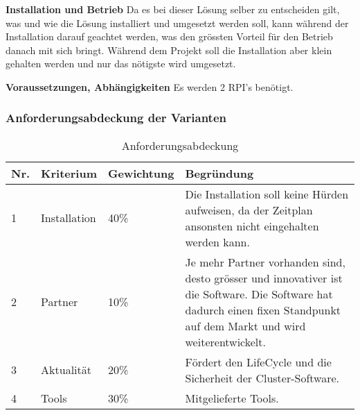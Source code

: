 \textbf{Installation und Betrieb}\newline
Da es bei dieser Lösung selber zu entscheiden gilt, was und wie die Lösung installiert und umgesetzt werden soll, kann während der Installation darauf geachtet werden, was den grössten Vorteil für den Betrieb danach mit sich bringt. Während dem Projekt soll die Installation aber klein gehalten werden und nur das nötigste wird umgesetzt. 

\textbf{Voraussetzungen, Abhängigkeiten}\newline
Es werden 2 RPI's benötigt.

\subsubsection{Anforderungsabdeckung der Varianten}

\begin{table}[H]
\centering
\begin{tabular}{p{1cm}p{2.5cm}p{2.2cm}p{10.3cm}}
\hline
\rowcolor{heading} \textbf{Nr.} & \textbf{Kriterium} & \textbf{Gewichtung} &\textbf{Begründung} \\\hline
1 & Installation & 40\% & Die Installation soll keine Hürden aufweisen, da der Zeitplan ansonsten nicht eingehalten werden kann. \\\hline
2 & Partner & 10\% & Je mehr Partner vorhanden sind, desto grösser und innovativer ist die Software. Die Software hat dadurch einen fixen Standpunkt auf dem Markt und wird weiterentwickelt. \\\hline
3 & Aktualität & 20\% & Fördert den LifeCycle und die Sicherheit der Cluster-Software. \\\hline
4 & Tools & 30\% & Mitgelieferte Tools. \\\hline
\end{tabular}
\caption{Anforderungsabdeckung}
\end{table}

